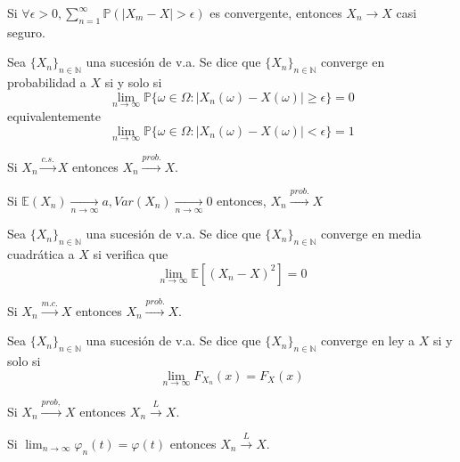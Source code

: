 \begin{obs}
Si $\forall \epsilon>0, \sum_{n=1}^\infty \mathbb{P}(|X_m -X|>\epsilon)$ es convergente, entonces $X_n\rightarrow X$ casi seguro.
\end{obs}

\begin{defn}
Sea $\{ X_n\}_{n\in\mathbb{N}}$ una sucesión de v.a. Se dice que $\{ X_n\}_{n\in\mathbb{N}}$ converge en probabilidad a $X$  si y solo si \[ \lim_{n\rightarrow\infty} \mathbb{P}\{ \omega\in\Omega:|X_n(\omega) -X(\omega)| \geq \epsilon \}=0 \] equivalentemente  \[ \lim_{n\rightarrow\infty} \mathbb{P}\{ \omega\in\Omega:|X_n(\omega) -X(\omega)| < \epsilon \}=1 \]
\end{defn}

\begin{obs}
Si $X_n\xrightarrow{c.s.}X$ entonces $X_n\xrightarrow{prob.}X$.
\end{obs}

\begin{obs}
Si $\mathbb{E}(X_n)\xrightarrow[n\rightarrow\infty]{} a, Var(X_n) \xrightarrow[n\rightarrow\infty]{}0$ entonces, $X_n\xrightarrow{prob.}X$
\end{obs}

\begin{defn}
Sea $\{ X_n\}_{n\in\mathbb{N}}$ una sucesión de v.a. Se dice que $\{ X_n\}_{n\in\mathbb{N}}$ converge en media cuadrática a $X$ si verifica que \[ \lim_{n\rightarrow\infty} \mathbb{E}[(X_n-X)^2] = 0 \]
\end{defn}

\begin{obs}
Si $X_n\xrightarrow{m.c.}X$ entonces $X_n\xrightarrow{prob.}X$.
\end{obs}

\begin{defn}
Sea $\{ X_n\}_{n\in\mathbb{N}}$ una sucesión de v.a. Se dice que $\{ X_n\}_{n\in\mathbb{N}}$ converge en ley a $X$  si y solo si \[ \lim_{n\rightarrow\infty} F_{X_n}(x) = F_{X}(x) \]
\end{defn}

\begin{obs}
Si $X_n\xrightarrow{prob,}X$ entonces $X_n\xrightarrow{L}X$.
\end{obs}

\begin{obs}
Si $\lim_{n\rightarrow\infty} \varphi_n(t) = \varphi(t)$ entonces $X_n\xrightarrow{L}X$.
\end{obs}

